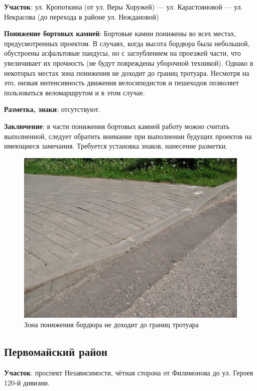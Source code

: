 \documentclass[a4paper,14pt,twoside]{extarticle}
\renewcommand\emph[1]{\textbf{#1}}
\begin{document}
\clearpage
\newpage

\emph{Участок}: ул. Кропоткина (от ул. Веры Хоружей) — ул. Карастояновой — ул. Некрасова (до перехода в районе ул. Неждановой)

\emph{Понижение бортовых камней}:
Бортовые камни понижены во всех местах, предусмотренных проектом. В случаях, когда высота бордюра была небольшой, обустроены асфальтовые пандусы, но с заглублением на проезжей части, что увеличивает их прочность (не будут повреждены уборочной техникой). Однако в некоторых местах зона понижения не доходит до границ тротуара. Несмотря на это, низкая интенсивность движения велосипедистов и пешеходов позволяет пользоваться веломаршрутом и в этом случае.

\emph{Разметка, знаки}: отсутствуют.

\emph{Заключение}: в части понижения бортовых камней работу можно считать выполненной, следует обратить внимание при выполнении будущих проектов на имеющиеся замечания. Требуется установка знаков, нанесение разметки.

\begin{figure}[h!]
    \centering
    \includegraphics[width=\textwidth]{Pictures/100000000000080000000600A54E4DB9.jpg}
    \caption{Зона понижения бордюра не доходит до границ тротуара}
\end{figure}

\clearpage
\newpage

\subsection*{Первомайский район}
\emph{Участок}: проспект Независимости, чётная сторона от Филимонова до ул. Героев 120-й дивизии.
\end{document}
